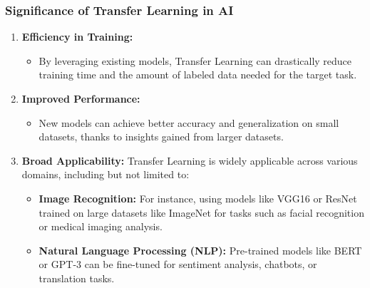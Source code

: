 \documentclass[aspectratio=169]{beamer}
\begin{document}
\begin{frame}[fragile]
    \frametitle{Significance of Transfer Learning in AI}
    \begin{enumerate}
        \item \textbf{Efficiency in Training:} 
        \begin{itemize}
            \item By leveraging existing models, Transfer Learning can drastically reduce training time and the amount of labeled data needed for the target task.
        \end{itemize}
        
        \item \textbf{Improved Performance:} 
        \begin{itemize}
            \item New models can achieve better accuracy and generalization on small datasets, thanks to insights gained from larger datasets.
        \end{itemize}
        
        \item \textbf{Broad Applicability:} 
        Transfer Learning is widely applicable across various domains, including but not limited to:
        \begin{itemize}
            \item \textbf{Image Recognition:} For instance, using models like VGG16 or ResNet trained on large datasets like ImageNet for tasks such as facial recognition or medical imaging analysis.
            \item \textbf{Natural Language Processing (NLP):} Pre-trained models like BERT or GPT-3 can be fine-tuned for sentiment analysis, chatbots, or translation tasks.
        \end{itemize}
    \end{enumerate}
\end{frame}
\end{document}
